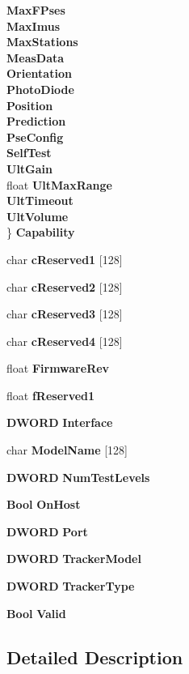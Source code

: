\begin{DoxyCompactItemize}
\begin{tabbing}
 {\bf MaxFPses}\\
 {\bf MaxImus}\\
 {\bf MaxStations}\\
 {\bf MeasData}\\
 {\bf Orientation}\\
 {\bf PhotoDiode}\\
 {\bf Position}\\
 {\bf Prediction}\\
 {\bf PseConfig}\\
 {\bf SelfTest}\\
 {\bf UltGain}\\
\>float {\bf UltMaxRange}\\
 {\bf UltTimeout}\\
 {\bf UltVolume}\\
\} {\bf Capability}\\

\end{tabbing}\item 
char {\bf c\-Reserved1} [128]
\item 
char {\bf c\-Reserved2} [128]
\item 
char {\bf c\-Reserved3} [128]
\item 
char {\bf c\-Reserved4} [128]
\item 
float {\bf \-Firmware\-Rev}
\item 
float {\bf f\-Reserved1}
\item 
{\bf \-D\-W\-O\-R\-D} {\bf \-Interface}
\item 
char {\bf \-Model\-Name} [128]
\item 
{\bf \-D\-W\-O\-R\-D} {\bf \-Num\-Test\-Levels}
\item 
{\bf \-Bool} {\bf \-On\-Host}
\item 
{\bf \-D\-W\-O\-R\-D} {\bf \-Port}
\item 
{\bf \-D\-W\-O\-R\-D} {\bf \-Tracker\-Model}
\item 
{\bf \-D\-W\-O\-R\-D} {\bf \-Tracker\-Type}
\item 
{\bf \-Bool} {\bf \-Valid}
\end{DoxyCompactItemize}


\subsection{\-Detailed \-Description}


